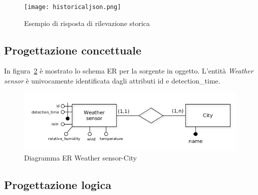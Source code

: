 \begin{figure}[H]
\centering
\texttt{[image: historicaljson.png]}
\caption*{Esempio di risposta di rilevazione storica}
\label{fig:historicaljson}
\end{figure}

\subsection{Progettazione concettuale}

In figura~\ref{fig:weather_detection_er} è mostrato lo schema ER per la sorgente in oggetto.
L'entità \textit{Weather sensor} è univocamente identificata dagli attributi id e detection\_time.

\begin{figure}[H]                                                                                                                                                            
\centering                                                                                                                                                                   
\includegraphics[width=\textwidth]{diagrams/weather_detection_er}                                                                                                                                   
\caption{Diagramma ER Weather sensor-City}                                                                                                                                            
\label{fig:weather_detection_er}                                                                                                                                                           
\end{figure}

\subsection{Progettazione logica}

